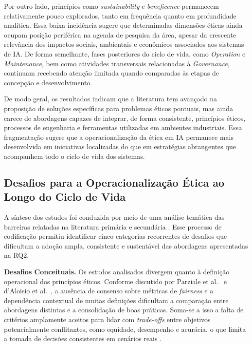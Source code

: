Por outro lado, princípios como \textit{sustainability} e \textit{beneficence} permanecem relativamente pouco explorados, tanto em frequência quanto em profundidade analítica. Essa baixa incidência sugere que determinadas dimensões éticas ainda ocupam posição periférica na agenda de pesquisa da área, apesar da crescente relevância dos impactos sociais, ambientais e econômicos associados aos sistemas de IA. De forma semelhante, fases posteriores do ciclo de vida, como \textit{Operation} e \textit{Maintenance}, bem como atividades transversais relacionadas à \textit{Governance}, continuam recebendo atenção limitada quando comparadas às etapas de concepção e desenvolvimento.

De modo geral, os resultados indicam que a literatura tem avançado na proposição de soluções específicas para problemas éticos pontuais, mas ainda carece de abordagens capazes de integrar, de forma consistente, princípios éticos, processos de engenharia e ferramentas utilizadas em ambientes industriais. Essa fragmentação sugere que a operacionalização da ética em IA permanece mais desenvolvida em iniciativas localizadas do que em estratégias abrangentes que acompanhem todo o ciclo de vida dos sistemas.

\subsection{Desafios para a Operacionalização Ética ao Longo do Ciclo de Vida}

A síntese dos estudos foi conduzida por meio de uma análise temática das barreiras relatadas na literatura primária e secundária \cite{S058, S022}. Esse processo de codificação permitiu identificar cinco categorias recorrentes de desafios que dificultam a adoção ampla, consistente e sustentável das abordagens apresentadas na RQ2.

\textbf{Desafios Conceituais.} Os estudos analisados divergem quanto à definição operacional dos princípios éticos. Conforme discutido por Parziale et al.~\cite{S034} e d'Aloisio et al.~\cite{S004}, a ausência de consenso sobre métricas de \textit{fairness} e a dependência contextual de muitas definições dificultam a comparação entre abordagens distintas e a consolidação de boas práticas. Soma-se a isso a falta de critérios amplamente aceitos para lidar com \textit{trade-offs} entre objetivos potencialmente conflitantes, como equidade, desempenho e acurácia, o que limita a tomada de decisões consistentes em cenários reais \cite{S034, S040}.

